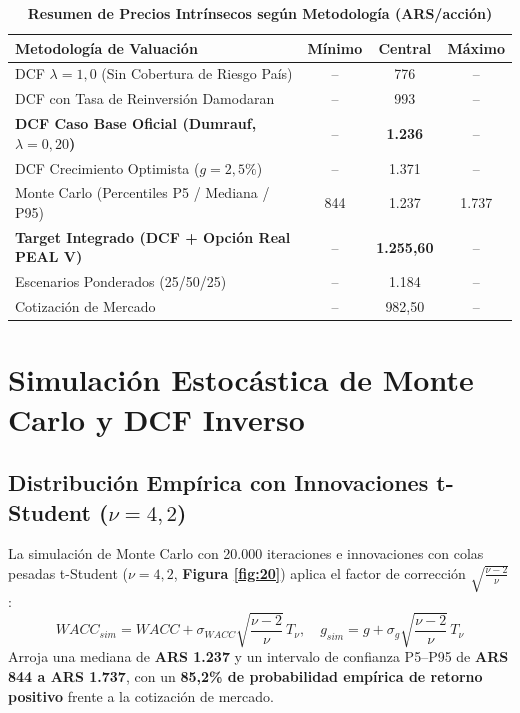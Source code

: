 \documentclass[10pt,a4paper]{article}
\begin{document}
\begin{table}[H]
\centering
\caption{\textbf{Resumen de Precios Intrínsecos según Metodología (ARS/acción)}}
\small
\begin{tabularx}{\textwidth}{Xccc}
\toprule
\textbf{Metodología de Valuación} & \textbf{Mínimo} & \textbf{Central} & \textbf{Máximo} \\
\midrule
DCF $\lambda=1,0$ (Sin Cobertura de Riesgo País) & -- & 776 & -- \\
DCF con Tasa de Reinversión Damodaran & -- & 993 & -- \\
\textbf{DCF Caso Base Oficial (Dumrauf, $\lambda=0,20$)} & -- & \textbf{1.236} & -- \\
DCF Crecimiento Optimista ($g=2,5\%$) & -- & 1.371 & -- \\
Monte Carlo (Percentiles P5 / Mediana / P95) & 844 & 1.237 & 1.737 \\
\midrule
\textbf{Target Integrado (DCF + Opción Real PEAL V)} & -- & \textbf{1.255,60} & -- \\
Escenarios Ponderados (25/50/25) & -- & 1.184 & -- \\
Cotización de Mercado & -- & 982,50 & -- \\
\bottomrule
\end{tabularx}
\end{table}

\section{Simulación Estocástica de Monte Carlo y DCF Inverso}

\subsection{Distribución Empírica con Innovaciones t-Student \texorpdfstring{($\nu=4,2$)}{(nu=4,2)}}
La simulación de Monte Carlo con 20.000 iteraciones e innovaciones con colas pesadas t-Student ($\nu = 4,2$, \textbf{Figura \ref{fig:20}}) aplica el factor de corrección $\sqrt{\frac{\nu-2}{\nu}}$:
\begin{equation}
    WACC_{sim} = WACC + \sigma_{WACC} \sqrt{\frac{\nu-2}{\nu}} \, T_\nu, \quad g_{sim} = g + \sigma_g \sqrt{\frac{\nu-2}{\nu}} \, T_\nu
\end{equation}
Arroja una mediana de \textbf{ARS 1.237} y un intervalo de confianza P5--P95 de \textbf{ARS 844 a ARS 1.737}, con un \textbf{85,2\% de probabilidad empírica de retorno positivo} frente a la cotización de mercado.
\end{document}
